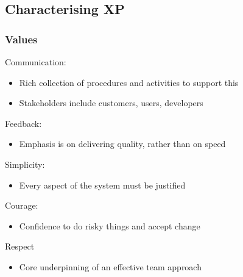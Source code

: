 \documentclass{article}[18pt]
\begin{document}
\subsection{Characterising XP}
\subsubsection{Values}
Communication:
\begin{itemize}
	\item Rich collection of procedures and activities to support this
	\item Stakeholders include customers, users, developers
\end{itemize}
Feedback:
\begin{itemize}
	\item Emphasis is on delivering quality, rather than on speed
\end{itemize}
Simplicity:
\begin{itemize}
	\item Every aspect of the system must be justified
\end{itemize}
Courage:
\begin{itemize}
	\item Confidence to do risky things and accept change
\end{itemize}
Respect
\begin{itemize}
	\item Core underpinning of an effective team approach
\end{itemize}
\end{document}
